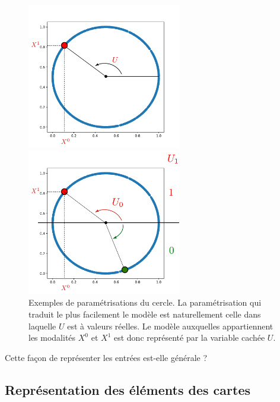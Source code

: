 \begin{figure}
\begin{minipage}{0.5\textwidth}
\centering
\includegraphics[width=0.6\textwidth]{cercle.pdf}
\end{minipage}
\begin{minipage}{0.5\textwidth}
\centering
\includegraphics[width=0.6\textwidth]{cercle_2.pdf}
\end{minipage}
\caption{Exemples de paramétrisations du cercle. La paramétrisation qui traduit le plus facilement le modèle est naturellement celle dans laquelle $U$ est à valeurs réelles. Le modèle auxquelles appartiennent les modalités $X^0$ et $X^1$ est donc représenté par la variable cachée $U$.}
\end{figure}

Cette façon de représenter les entrées est-elle générale ? 


\subsection{Représentation des éléments des cartes}

